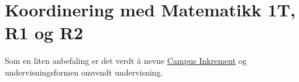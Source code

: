 \section{Koordinering med Matematikk 1T, R1 og R2} \label{Sec: KoordR1R2}

	Som en liten anbefaling er det verdt å nevne \href{https://campus.inkrement.no/Home/Catalog}{Campus Inkrement} og undervisningsformen omvendt undervisning.

